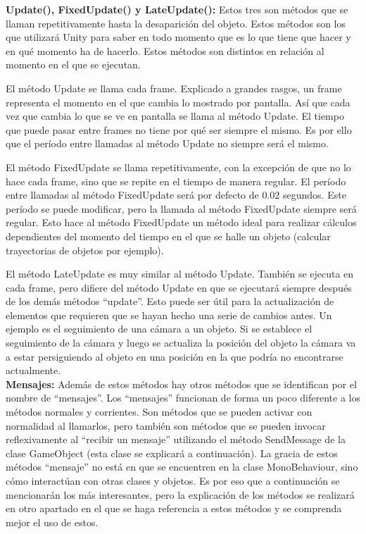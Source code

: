 \textbf{Update(), FixedUpdate() y LateUpdate():} Estos tres son métodos que se llaman repetitivamente hasta la desaparición del objeto. Estos métodos son los que utilizará Unity para saber en todo momento que es lo que tiene que hacer y en qué momento ha de hacerlo. Estos métodos son distintos en relación al momento en el que se ejecutan.

El método Update se llama cada frame. Explicado a grandes rasgos, un frame representa el momento en el que cambia lo mostrado por pantalla. Así que cada vez que cambia lo que se ve en pantalla se llama al método Update. El tiempo que puede pasar entre frames no tiene por qué ser siempre el mismo. Es por ello que el período entre llamadas al método Update no siempre será el mismo.

El método FixedUpdate se llama repetitivamente, con la excepción de que no lo hace cada frame, sino que se repite en el tiempo de manera regular. El período entre llamadas al método FixedUpdate será por defecto de 0.02 segundos. Este período se puede modificar, pero la llamada al método FixedUpdate siempre será regular. Esto hace al método FixedUpdate un método ideal para realizar cálculos dependientes del momento del tiempo en el que se halle un objeto (calcular trayectorias de objetos por ejemplo).

El método LateUpdate es muy similar al método Update. También se ejecuta en cada frame, pero difiere del método Update en que se ejecutará siempre después de los demás métodos “update”. Esto puede ser útil para la actualización de elementos que requieren que se hayan hecho una serie de cambios antes. Un ejemplo es el seguimiento de una cámara a un objeto. Si se establece el seguimiento de la cámara y luego se actualiza la posición del objeto la cámara va a estar persiguiendo al objeto en una posición en la que podría no encontrarse actualmente.\\


\textbf{Mensajes:} Además de estos métodos hay otros métodos que se identifican por el nombre de “mensajes”. Los “mensajes” funcionan de forma un poco diferente a los métodos normales y corrientes. Son métodos que se pueden activar con normalidad al llamarlos, pero también son métodos que se pueden invocar reflexivamente al “recibir un mensaje” utilizando el método SendMessage de la clase GameObject (esta clase se explicará a continuación). La gracia de estos métodos “mensaje” no está en que se encuentren en la clase MonoBehaviour, sino cómo interactúan con otras clases y objetos. Es por eso que a continuación se mencionarán los más interesantes, pero la explicación de los métodos se realizará en otro apartado en el que se haga referencia a estos métodos y se comprenda mejor el uso de estos.

